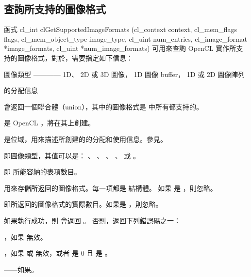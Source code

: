 \subsection{查詢所支持的圖像格式}

函式
\startclc
cl_int clGetSupportedImageFormats (cl_context context,
			cl_mem_flags flags,
			cl_mem_object_type image_type,
			cl_uint num_entries,
			cl_image_format *image_formats,
			cl_uint *num_image_formats)
\stopclc
可用來查詢 OpenCL 實作所支持的圖像格式，對於，需要指定如下信息：
\startigBase
\item {}
\item 圖像類型 ———— 1D、 2D 或 3D 圖像， 1D 圖像 buffer， 1D 或 2D 圖像陣列
\item {}的分配信息
\stopigBase

 會返回一個聯合體（union），其中的圖像格式是  中所有都支持的。

 是 OpenCL ，將在其上創建。

 是位域，用來描述所創建的的分配和使用信息。參見。

 即圖像類型，其值可以是： 、 
、 、 
、  或 
。

 即  所能容納的表項數目。

 用來存儲所返回的圖像格式。每一項都是  結構體。
如果  是 ，則忽略。

 即所返回的圖像格式的實際數目。如果是 ，則忽略。

如果執行成功，則  會返回 。
否則，返回下列錯誤碼之一：

\startigBase
\item {}，如果  無效。

\item {}，如果  或  無效，或者  是 0 且  是 。

\item {}——如果\scdevfailres。

